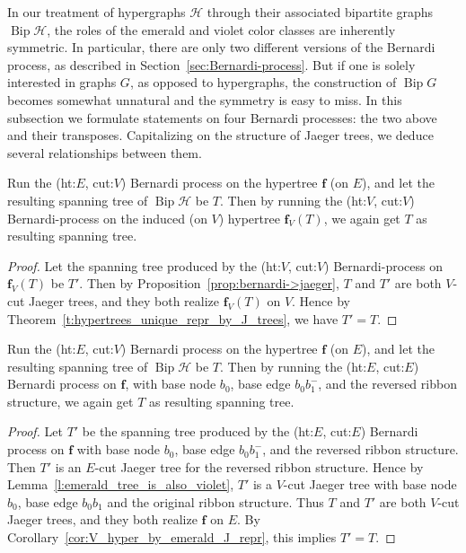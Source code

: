 \documentclass[ALCO,ThmDefs,Unicode,epreuves]{cedram}
\newcommand{\HH}{\mathcal H}
\DeclareMathOperator{\bip}{Bip}
\begin{document}
In our treatment of hypergraphs $\HH$ through their associated bipartite graphs $\bip\HH$, the roles of the emerald and violet color classes are inherently symmetric. In particular, there are only two different versions of the Bernardi process, as described in Section~\ref{sec:Bernardi-process}. But if one is solely interested in graphs $G$, as opposed to hypergraphs, the construction of $\bip G$ becomes somewhat unnatural and the symmetry is easy to miss. In this subsection we formulate statements on four Bernardi processes: the two above and their transposes. Capitalizing on the structure of Jaeger trees, we deduce several relationships between them.

\begin{theo}
Run the (ht:$E$, cut:$V$) Bernardi process on the hypertree $\mathbf f$ (on $E$), and let the resulting spanning tree of $\bip \HH$ be $T$. Then by running the (ht:$V$, cut:$V$) Bernardi-process on the induced (on $V$) hypertree $\mathbf f_V(T)$, we again get $T$ as resulting spanning tree.
\end{theo}

\begin{proof}
Let the spanning tree produced by the (ht:$V$, cut:$V$) Bernardi-process on $\mathbf f_V(T)$ be $T'$. Then by Proposition~\ref{prop:bernardi->jaeger}, $T$ and $T'$ are both $V$-cut Jaeger trees, and they both realize $\mathbf f_V(T)$ on $V$. Hence by Theorem~\ref{t:hypertrees_unique_repr_by_J_trees}, we have $T'=T$.
\end{proof}

\begin{theo}\label{thm:inverses}
Run the (ht:$E$, cut:$V$) Bernardi process on the hypertree $\mathbf f$ (on $E$), and let the resulting spanning tree of $\bip \HH$ be $T$. Then by running the (ht:$E$, cut:$E$) Bernardi process on $\mathbf f$, with base node $b_0$, base edge $b_0b_1^-$, and the reversed ribbon structure, we again get $T$ as resulting spanning tree.
\end{theo}

\begin{proof}
Let $T'$ be the spanning tree produced by the (ht:$E$, cut:$E$) Bernardi process on $\mathbf f$ with base node $b_0$, base edge $b_0b_1^-$, and the reversed ribbon structure. Then $T'$ is an $E$-cut Jaeger tree for the reversed ribbon structure. Hence by Lemma~\ref{l:emerald_tree_is_also_violet}, $T'$ is a $V$-cut Jaeger tree with base node $b_0$, base edge $b_0b_1$ and the original ribbon structure. Thus $T$ and $T'$ are both $V$-cut Jaeger trees, and they both realize $\mathbf f$ on $E$. By Corollary~\ref{cor:V_hyper_by_emerald_J_repr}, this implies $T'=T$.
\end{proof}
\end{document}
